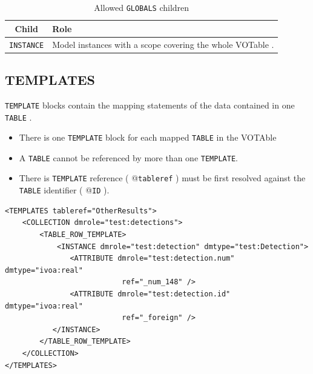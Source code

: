 \documentclass[11pt,a4paper]{ivoa}
\begin{document}
\begin{table}[hbtp]
\small
\centering
\begin{tabulary}{\linewidth}{|c|J|}       
       \hline 
           \textbf{Child} &  
           \textbf{Role}\\
       \hline         \hline  
            \texttt{INSTANCE}    &  
            Model instances with a scope covering the whole VOTable . \\       
       \hline 
     \end{tabulary}
     \caption{Allowed  \texttt{GLOBALS} children} 
     \label{tbl:globals-children}
 \end{table}


%
%
\clearpage
\subsection{TEMPLATES}

\texttt{TEMPLATE} blocks contain the mapping statements of the data contained in one \texttt{TABLE} .

\begin{itemize}
    \item There is one \texttt{TEMPLATE} block for each mapped \texttt{TABLE}  in the VOTAble    
    \item A \texttt{TABLE} cannot be referenced by more than one \texttt{TEMPLATE}.
    \item  There is \texttt{TEMPLATE} reference ( @\texttt{tableref} ) must be first resolved against the \texttt{TABLE} identifier (  @\texttt{ID} ).
\end{itemize}

\begin{lstlisting}[caption={GLOBALS block example},style=XML]
<TEMPLATES tableref="OtherResults">
    <COLLECTION dmrole="test:detections">
        <TABLE_ROW_TEMPLATE>
            <INSTANCE dmrole="test:detection" dmtype="test:Detection">
               <ATTRIBUTE dmrole="test:detection.num" dmtype="ivoa:real"
                           ref="_num_148" />
               <ATTRIBUTE dmrole="test:detection.id" dmtype="ivoa:real"
                           ref="_foreign" />
           </INSTANCE>
        </TABLE_ROW_TEMPLATE>
    </COLLECTION>
</TEMPLATES>
\end{lstlisting}
\end{document}
